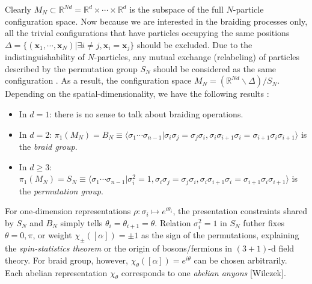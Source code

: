 \begin{itemize}
            Clearly $M_N\subset\mathbb R^{Nd}=\mathbb R^d\times\cdots\times\mathbb R^d$ is the subspace of the full $N$-particle configuration space. Now because we are interested in the braiding processes only, all the trivial configurations that have particles occupying the same positions $\Delta=\{(\bm x_1,\cdots,\bm x_N)|\exists i\neq j, \bm x_i=\bm x_j\}$ should be excluded. Due to the indistinguishability of $N$-particles, any mutual exchange (relabeling) of particles described by the permutation group $S_N$ should be considered as the same configuration . As a result, the configuration space $M_N=(\mathbb R^{Nd}\backslash \Delta)/S_N$. Depending on the spatial-dimensionality, we have the following results \cite{wu1984general}:
            \begin{itemize}
                \item In $d=1$: there is no sense to talk about braiding operations.
                \item In $d=2$: $\pi_1(M_N)=B_N\equiv\langle\sigma_1\cdots\sigma_{n-1}|\sigma_i\sigma_j=\sigma_j\sigma_i,\sigma_i \sigma_{i+1}\sigma_i=\sigma_{i+1}\sigma_i \sigma_{i+1}\rangle$ is the \emph{braid group}.
                \item In $d\geq3$: $\pi_1(M_N)=S_N\equiv\langle\sigma_1\cdots\sigma_{n-1}|\sigma_i^2=1,\sigma_i\sigma_j=\sigma_j\sigma_i,\sigma_i \sigma_{i+1}\sigma_i=\sigma_{i+1}\sigma_i \sigma_{i+1}\rangle$ is the \emph{permutation group}.
            \end{itemize}
            For one-dimension representations $\rho:\sigma_i\mapsto e^{i\theta_i}$, the presentation constraints shared by $S_N$ and $B_N$ simply tells $\theta_i=\theta_{i+1}=\theta$. Relation $\sigma_i^2=1$ in $S_N$ futher fixes $\theta=0,\pi$, or weight $\chi_\pm([\alpha])=\pm1$ as the sign of the permutations, explaining the \emph{spin-statistics theorem} or the origin of bosons/fermions in $(3+1)$-d field theory. For braid group, however, $\chi_\theta([\alpha])=e^{i\theta}$ can be chosen arbitrarily. Each abelian representation $\chi_\theta$ corresponds to one \emph{abelian anyons} [Wilczek].


\end{itemize}
